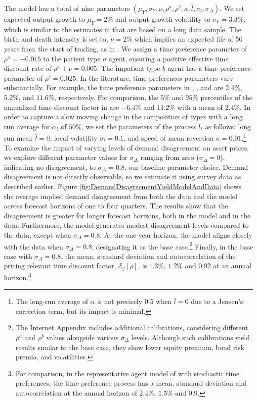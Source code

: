 \documentclass[preprint,11pt,authoryear]{elsarticle}
\theoremstyle{plain}
\begin{document}
The model has a total of nine parameters $\left(\mu_Y, \sigma_Y, \nu, \rho^a, \rho^b, \kappa, \bar{l}, \sigma_l, \sigma_{\Delta}\right)$. We set expected output growth to $\mu_Y=2\%$ and output growth volatility to $\sigma_Y = 3.3\%$, which is similar to the estimates in \cite{campbell-cochrane:99} that are based on a long data sample. The birth and death intensity is set to, $\nu = 2\%$  which implies an expected life of 50 years from the start of trading, as in  \cite{Garleanu2008}. We assign a time preference parameter of $\rho^a = -0.015$ to the patient type $a$ agent, ensuring a positive effective time discount rate of $\rho^a + \nu = 0.005$. The impatient type $b$ agent has a time preference parameter of $\rho^b = 0.025$. In the literature, time preferences parameters vary substantially. For example, the time preference parameters in \cite{bansal-yaron:04}, \cite{chan-kogan:02},  and \cite{campbell-cochrane:99} are $2.4\%$, $5.2\%$, and $11.6\%$, respectively. For comparison, the $5\%$ and $95\%$ percentiles of the annualized time discount factor in \cite{ALBUQUERQUE2016} are $-6.4\%$ and $11.2\%$ with a mean of $2.4\%$. 
In order to capture a slow moving change in the composition of types with a long run average for $\alpha_t$ of $50\%$, we set the parameters of the process $l_t$ as follows: long run mean $\bar{l}=0$, local volatility $\sigma_l=0.1$, and speed of mean reversion $\kappa=0.01$.\footnote{The long-run average of $\alpha$ is not precisely 0.5 when $\bar{l}=0$ due to a Jensen's correction term, but its impact is minimal.} To examine the impact of varying levels of demand disagreement on asset prices, we explore different parameter values for $\sigma_{\Delta}$ ranging from zero ($\sigma_{\Delta}= 0$), indicating no disagreement, to $\sigma_{\Delta}= 0.8$, our baseline parameter choice. Demand disagreement is not directly observable, so we estimate it using survey data as described earlier. Figure \ref{fig:DemandDisagreementYieldModelAndData} shows the average implied demand disagreement from both the data and the model across forecast horizons of one to four quarters. The results show that the disagreement is greater for longer forecast horizons, both in the model and in the data. Furthermore, the model generates modest disagreement levels compared to the data, except when $\sigma_{\Delta}= 0.8$. At the one-year horizon, the model aligns closely with the data when $\sigma_{\Delta}= 0.8$, designating it as the base case.\footnote{The Internet Appendix includes additional calibrations, considering different $\rho^a$ and $\rho^b$ values alongside various $\sigma_{\Delta}$ levels. Although such calibrations yield results similar to the base case, they show lower equity premium, bond risk premia, and volatilities.} Finally, in the base case with $\sigma_{\Delta}= 0.8$, the mean, standard deviation and autocorrelation of the pricing relevant time discount factor, $\mathcal{E}_{f}\left [ \rho \right]$, is $1.3\%$, $1.2\%$ and $0.92$ at an annual horizon.\footnote{For comparison, in the representative agent model of \cite{ALBUQUERQUE2016} with stochastic time preferences, the time preference process has a mean, standard deviation and autocorrelation at the annual horizon of $2.4\%$, $1.5\%$ and $0.9$.}
\end{document}
